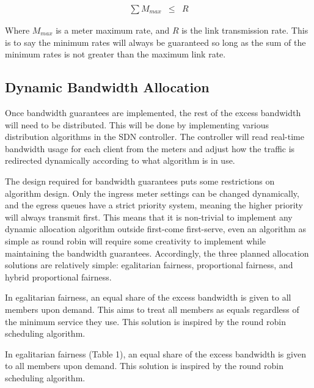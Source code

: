 \documentclass[accepted,single]{gipaper}
\begin{document}
\begin{eqnarray*}
	\sum M_{max} &\leq& R
\end{eqnarray*}

Where $M_{max}$ is a meter maximum rate, and $R$ is the link transmission rate. This is to say the minimum rates will always be guaranteed so long as the sum of the minimum rates is not greater than the maximum link rate.

\subsection{Dynamic Bandwidth Allocation}
\label{sol_dynamic_alloc}

Once bandwidth guarantees are implemented, the rest of the excess bandwidth will need to be distributed. This will be done by implementing various distribution algorithms in the SDN controller. The controller will read real-time bandwidth usage for each client from the meters and adjust how the traffic is redirected dynamically according to what algorithm is in use. 

The design required for bandwidth guarantees puts some restrictions on algorithm design. Only the ingress meter settings can be changed dynamically, and the egress queues have a strict priority system, meaning the higher priority will always transmit first. This means that it is non-trivial to implement any dynamic allocation algorithm outside first-come first-serve, even an algorithm as simple as round robin will require some creativity to implement while maintaining the bandwidth guarantees. Accordingly, the three planned allocation solutions are relatively simple: egalitarian fairness, proportional fairness, and hybrid proportional fairness.

In egalitarian fairness, an equal share of the excess bandwidth is given to all members upon demand. This aims to treat all members as equals regardless of the minimum service they use. This solution is inspired by the round robin scheduling algorithm.

\iffalse
In egalitarian fairness (Table 1), an equal share of the excess bandwidth is given to all members upon demand. This solution is inspired by the round robin scheduling algorithm. \\
\end{document}
